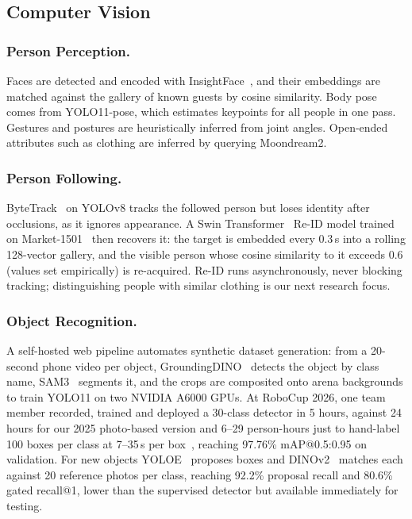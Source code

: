 \subsection{Computer Vision}

\subsubsection{Person Perception.}
Faces are detected and encoded with InsightFace~\cite{arcface}, and their embeddings are matched against the gallery of known guests by cosine similarity. Body pose comes from YOLO11-pose, which estimates keypoints for all people in one pass. Gestures and postures are heuristically inferred from joint angles. Open-ended attributes such as clothing are inferred by querying Moondream2.

\subsubsection{Person Following.}
ByteTrack~\cite{bytetrack} on YOLOv8 tracks the followed person but loses identity after occlusions, as it ignores appearance. A Swin Transformer~\cite{swin} Re-ID model trained on Market-1501~\cite{zheng2015market} then recovers it: the target is embedded every 0.3\,s into a rolling 128-vector gallery, and the visible person whose cosine similarity to it exceeds 0.6 (values set empirically) is re-acquired. Re-ID runs asynchronously, never blocking tracking; distinguishing people with similar clothing is our next research focus.

\subsubsection{Object Recognition.}
A self-hosted web pipeline automates synthetic dataset generation: from a 20-second phone video per object, GroundingDINO~\cite{grounding_dino} detects the object by class name, SAM3~\cite{sam3} segments it, and the crops are composited onto arena backgrounds to train YOLO11 on two NVIDIA A6000 GPUs. At RoboCup 2026, one team member recorded, trained and deployed a 30-class detector in 5 hours, against 24 hours for our 2025 photo-based version and 6--29 person-hours just to hand-label 100 boxes per class at 7--35\,s per box~\cite{papadopoulos2017extreme}, reaching 97.76\% mAP@0.5:0.95 on validation. For new objects YOLOE~\cite{yoloe} proposes boxes and DINOv2~\cite{dinov2} matches each against 20 reference photos per class, reaching 92.2\% proposal recall and 80.6\% gated recall@1, lower than the supervised detector but available immediately for testing.